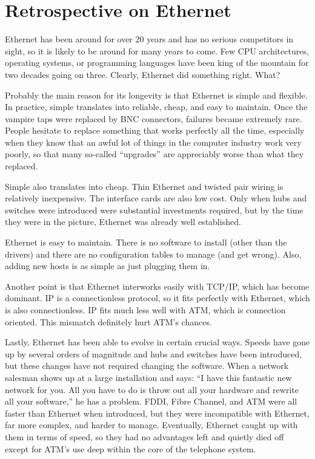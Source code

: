 \section{Retrospective on Ethernet}

Ethernet has been around for over 20 years and has no serious
competitors in sight, so it is likely to be around for many years to
come. Few CPU architectures, operating systems, or programming languages
have been king of the mountain for two decades going on three. Clearly,
Ethernet did something right. What?

Probably the main reason for its longevity is that Ethernet is simple
and flexible. In practice, simple translates into reliable, cheap, and
easy to maintain. Once the vampire taps were replaced by BNC connectors,
failures became extremely rare. People hesitate to replace something
that works perfectly all the time, especially when they know that an
awful lot of things in the computer industry work very poorly, so that
many so-called ``upgrades'' are appreciably worse than what they
replaced.

Simple also translates into cheap. Thin Ethernet and twisted pair wiring
is relatively inexpensive. The interface cards are also low cost. Only
when hubs and switches were introduced were substantial investments
required, but by the time they were in the picture, Ethernet was already
well established.

Ethernet is easy to maintain. There is no software to install (other
than the drivers) and there are no configuration tables to manage (and
get wrong). Also, adding new hosts is as simple as just plugging them
in.

Another point is that Ethernet interworks easily with TCP/IP, which has
become dominant. IP is a connectionless protocol, so it fits perfectly
with Ethernet, which is also connectionless. IP fits much less well with
ATM, which is connection oriented. This mismatch definitely hurt ATM's
chances.

Lastly, Ethernet has been able to evolve in certain crucial ways. Speeds
have gone up by several orders of magnitude and hubs and switches have
been introduced, but these changes have not required changing the
software. When a network salesman shows up at a large installation and
says: ``I have this fantastic new network for you. All you have to do is
throw out all your hardware and rewrite all your software,'' he has a
problem. FDDI, Fibre Channel, and ATM were all faster than Ethernet when
introduced, but they were incompatible with Ethernet, far more complex,
and harder to manage. Eventually, Ethernet caught up with them in terms
of speed, so they had no advantages left and quietly died off except for
ATM's use deep within the core of the telephone system.

